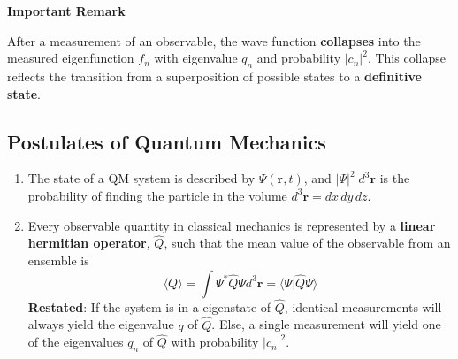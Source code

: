 \textbf{Important Remark}

After a measurement of an observable, the wave function \textbf{collapses} into the measured eigenfunction $f_n$ with eigenvalue $q_n$ and probability $|c_n|^2$. This collapse reflects the transition from a superposition of possible states to a \textbf{definitive state}.

\subsection{Postulates of Quantum Mechanics}

\begin{enumerate}
    \item The state of a QM system is described by $\Psi(\mathbf{r},t)$, and $|\Psi|^2\; d^3 \mathbf{r}$ is the probability of finding the particle in the volume $d^3 \mathbf{r} = dx\,dy\,dz$.
    \item Every observable quantity in classical mechanics is represented by a \textbf{linear hermitian operator}, $\hat{Q}$, such that the mean value of the observable from an ensemble is
          \noindent\begin{equation*}
              \langle Q\rangle=\int\Psi^{*}\hat{Q}\Psi d^{3} \mathbf{r}= \langle\Psi|\hat{Q}\Psi\rangle
          \end{equation*}\newline
          \textbf{Restated}:
          If the system is in a eigenstate of $\hat{Q}$, identical measurements will always yield the eigenvalue $q$ of $\hat{Q}$.
          Else, a single measurement will yield one of the eigenvalues $q_n$ of $\hat{Q}$ with probability $|c_n|^2$.
\end{enumerate}